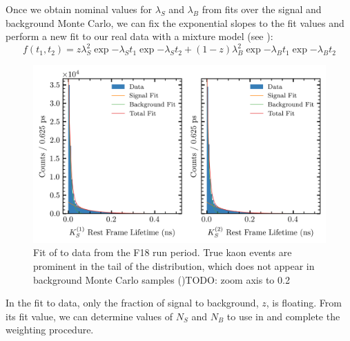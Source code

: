 Once we obtain nominal values for $\lambda_S$ and $\lambda_B$ from fits over the signal and background Monte Carlo, we can fix the exponential slopes to the fit values and perform a new fit to our real data with a mixture model (see ):
\begin{equation}
  f(t_1, t_2) = z \lambda_S^2\exp{-\lambda_S t_1}\exp{-\lambda_S t_2} + (1-z) \lambda_B^2\exp{-\lambda_B t_1}\exp{-\lambda_B t_2}
  \label{eq:splot:mixture}
\end{equation}
\begin{figure}
  \begin{center}
    \includegraphics[width=.8\columnwidth]{figures/sPlot_fit_data_F18_fiducial@accidentals@chisqndf-4}
  \end{center}
  \caption{Fit of  to data from the F18 run period. True kaon events are prominent in the tail of the distribution, which does not appear in background Monte Carlo samples (){\color{red}TODO: zoom axis to 0.2}}\label{fig:data_f18_splot_fit}
\end{figure}

In the fit to data, only the fraction of signal to background, $z$, is floating. From its fit value, we can determine values of $N_S$ and $N_B$ to use in  and complete the weighting procedure.
